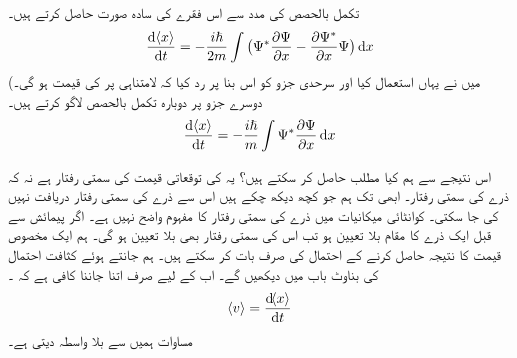 تکمل بالحصص کی مدد سے اس فقرے کی سادہ صورت حاصل کرتے ہیں۔
\begin{align}
\frac{\dif\, \langle x \rangle}{\dif{t}}=-\frac{i\hslash}{2m}\int\big (\Psi^*\frac{\partial{\Psi}}{\partial{x}}-\frac{\partial{\Psi^*}}{\partial{x}}\Psi \big)\dif{x}
\end{align}
(میں نے یہاں  استعمال کیا اور سرحدی جزو کو اس بنا پر رد کیا کہ  لامتناہی پر  کی قیمت  ہو گی۔ دوسرے جزو پر دوبارہ تکمل بالحصص لاگو کرتے ہیں۔
\begin{align}\label{مساوات_تفاعل_موج_توقعاتی_قیمت_رفتار}
\frac{\dif \,\langle x \rangle}{\dif{t}}=-\frac{i\hslash}{m}\int\Psi^*\frac{\partial{\Psi}}{\partial{x}} \dif{x}
\end{align}

اس نتیجے سے ہم کیا مطلب حاصل کر سکتے ہیں؟ یہ  کی توقعاتی قیمت کی سمتی رفتار ہے نہ کہ ذرے کی سمتی رفتار۔ ابھی تک ہم جو کچھ دیکھ چکے ہیں اس سے ذرے کی سمتی رفتار دریافت نہیں کی جا سکتی۔ کوانٹائی میکانیات میں ذرے کی سمتی رفتار کا مفہوم واضح نہیں ہے۔ اگر پیمائش سے قبل ایک ذرے کا مقام بلا تعیین ہو تب اس کی سمتی رفتار بھی بلا تعیین ہو گی۔ ہم ایک مخصوص قیمت کا نتیجہ حاصل کرنے کے احتمال کی صرف بات کر سکتے ہیں۔ ہم  جانتے ہوئے کثافت احتمال کی بناوٹ باب  میں دیکھیں گے۔ اب کے لیے صرف اتنا جاننا کافی ہے کہ ۔
\begin{align}\label{مساوات_تفاعل_موج_تعریف_رفتار}
\langle v \rangle=\frac{\dif\langle x \rangle}{\dif{t}}
\end{align}
مساوات  ہمیں  سے بلا واسطہ  دیتی ہے۔ 

